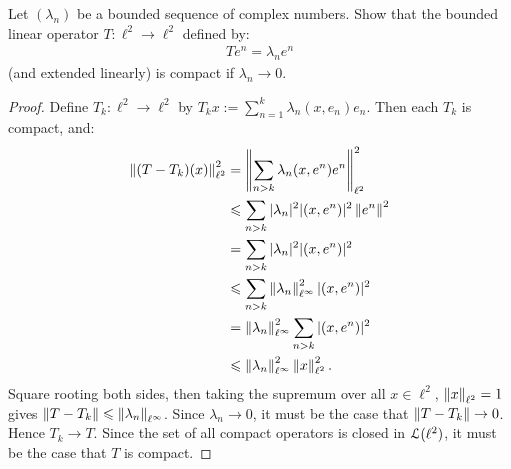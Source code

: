 \documentclass[10pt,oneside,openany]{memoir}
\begin{document}
\begin{exercise}[manual-num={4}]
Let $(\lambda_n)$ be a bounded sequence of complex numbers. Show that the bounded linear operator $T:\ell^2 \rightarrow \ell^2$ defined by:
    \begin{equation*}
    \begin{split}
        T e^n = \lambda_n e^n
    \end{split}
    \end{equation*}
(and extended linearly) is compact if $\lambda_n \rightarrow 0$.
\end{exercise}
    \begin{proof}
        Define $T_k:\ell^2 \rightarrow \ell^2$ by $T_kx := \sum_{n = 1}^k \lambda_n (x,e_n)e_n$. Then each $T_k$ is compact, and:
            \begin{equation*}
            \begin{split}
                \left\lVert (T-T_k)(x) \right\rVert_{\ell^2}^2 
                & = \left\lVert \sum_{n > k}\lambda_n (x,e^n)e^n \right\rVert_{\ell^2}^2 \\
                & \leqslant \sum_{n > k}|\lambda_n|^2 |(x,e^n)|^2 \left\lVert e^n \right\rVert^2 \\
                & = \sum_{n > k}|\lambda_n|^2 |(x,e^n)|^2 \\
                & \leqslant \sum_{n > k}\left\lVert \lambda_n \right\rVert_{\ell^\infty}^2 |(x,e^n)|^2 \\
                & = \left\lVert \lambda_n \right\rVert_{\ell^\infty}^2 \sum_{n > k}|(x,e^n)|^2 \\
                & \leqslant \left\lVert \lambda_n \right\rVert_{\ell^\infty}^2 \left\lVert x \right\rVert_{\ell^2}^2.
            \end{split}
            \end{equation*}
        Square rooting both sides, then taking the supremum over all $x \in \ell^2$, $\left\lVert x \right\rVert_{\ell^2} = 1$ gives $\left\lVert T - T_k \right\rVert \leqslant \left\lVert \lambda_n \right\rVert_{\ell^\infty}$. Since $\lambda_n \rightarrow 0$, it must be the case that $\left\lVert T - T_k \right\rVert \rightarrow 0$. Hence $T_k \rightarrow T$. Since the set of all compact operators is closed in $\mathcal{L}(\ell^2)$, it must be the case that $T$ is compact.
    \end{proof}
\end{document}
